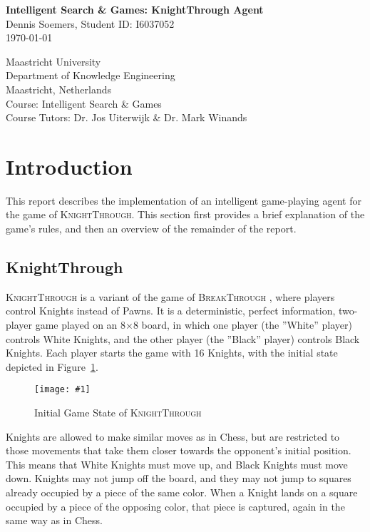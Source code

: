 \documentclass{article}
\newcommand{\insertfigure}[3]{ 
	\begin{figure}[#3]
	\begin{center}
	\texttt{[image: \#1]}
	\caption{#2}
	\label{#1}
	\end{center}
	\end{figure}
}
\newcommand{\reffigure}[1]{Figure~\ref{#1}}
\begin{document}
\begin{titlepage}
\begin{center}
{\huge \bfseries Intelligent Search \& Games: KnightThrough Agent} \\
\vspace{1cm}
{\large Dennis Soemers, Student ID: I6037052}\\
\vspace{2cm}
{\large \today}\\
\vfill
\end{center}
\textrm{Maastricht University} \\
\textrm{Department of Knowledge Engineering} \\
\textrm{Maastricht, Netherlands} \\
\textrm{Course: Intelligent Search \& Games} \\
\textrm{Course Tutors: Dr. Jos Uiterwijk \& Dr. Mark Winands}

\end{titlepage}

\section{Introduction} 
This report describes the implementation of an intelligent game-playing agent for the game of \textsc{KnightThrough}. This section first provides a brief explanation of the game's rules, and then an overview of the remainder of the report.

\subsection{KnightThrough}
\textsc{KnightThrough} is a variant of the game of \textsc{BreakThrough} \cite{Breakthrough2001}, where players control Knights instead of Pawns. It is a deterministic, perfect information, two-player game played on an 8$\times$8 board, in which one player (the ''White'' player) controls White Knights, and the other player (the ''Black'' player) controls Black Knights. Each player starts the game with 16 Knights, with the initial state depicted in \reffigure{KnightThroughInitialPosition}.

\insertfigure{KnightThroughInitialPosition}{Initial Game State of \textsc{KnightThrough}}{h}

Knights are allowed to make similar moves as in Chess, but are restricted to those movements that take them closer towards the opponent's initial position. This means that White Knights must move up, and Black Knights must move down. Knights may not jump off the board, and they may not jump to squares already occupied by a piece of the same color. When a Knight lands on a square occupied by a piece of the opposing color, that piece is captured, again in the same way as in Chess.
\end{document}
